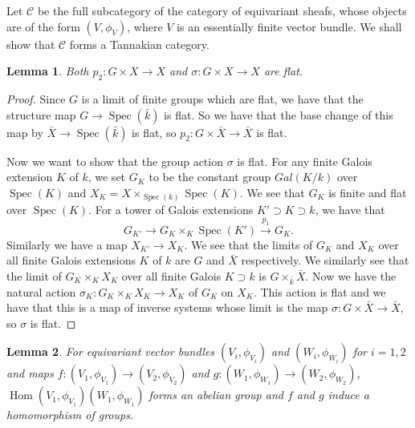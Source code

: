 \documentclass{article}
\newcommand{\spec}[1]{\operatorname{Spec}(#1)}
\newcommand{\Hom}{\operatorname{Hom}}
\newcommand{\cat}{\mathcal C} %
\newtheorem{lemma}{Lemma}
\begin{document}
Let $\cat$ be the full subcategory of the category of equivariant sheafs, whose objects are of the form $(V,\phi_V)$,
where $V$ is an essentially finite vector bundle. We shall show that $\cat$ forms a Tannakian category. 

\begin{lemma}
  Both $p_2:G \times X \rightarrow X$ and $\sigma:G \times X \rightarrow X$ are flat.
\end{lemma}
\begin{proof}
  Since $G$ is a limit of finite groups which are flat, we have that the structure map $G \rightarrow \spec {\bar k}$ 
  is flat. So we have that the base change of this map by $\bar X \rightarrow \spec {\bar k}$ is flat, so 
  $p_2: G \times \bar X \rightarrow \bar X$ is flat.

  Now we want to show that the group action $\sigma$ is flat. For any finite Galois extension $K$ of $k$, we set
  $G_K$ to be the constant group $Gal(K/k)$ over $\spec K$ and $X_K = X \times _{\spec k} \spec K$. We see that
  $G_K$ is finite and flat over $\spec K$. For a tower of Galois extensions $K' \supset K \supset k$, we have that
  $$G_{K'} \rightarrow G_K \times_K \spec {K'} \xrightarrow {p_1} G_K.$$ 
  Similarly we have a map $X_{K'} \rightarrow X_K$. We see that the limits of $G_K$ and $X_K$ over all finite Galois
  extensions $K$ of $k$ are $G$ and $\bar X$ respectively. We similarly see that the limit of $G_K \times_K X_K$ 
  over all finite Galois $K\supset k$ is $G \times_{\bar k} \bar X$. Now we have the natural action 
  $\sigma_K: G_K \times_K X_K \rightarrow X_K$ of $G_K$ on $X_K$. This action is flat and we have that this is a map
  of inverse systems whose limit is the map $\sigma: G \times \bar X \rightarrow \bar X$, so $\sigma$ is flat.
\end{proof}
\begin{lemma}
  For equivariant vector bundles $(V_i,\phi_{V_i})$ and $(W_i,\phi_{W_i})$ for $i=1,2$ and maps
  $f:(V_1,\phi_{V_1}) \rightarrow (V_2,\phi_{V_2})$ and $g:(W_1,\phi_{W_1}) \rightarrow (W_2,\phi_{W_2})$, 
  $\Hom (V_1,\phi_{V_1}){(W_1,\phi_{W_1})}$ forms an abelian group and $f$ and $g$ induce a homomorphism of groups.
\end{lemma}
\end{document}
